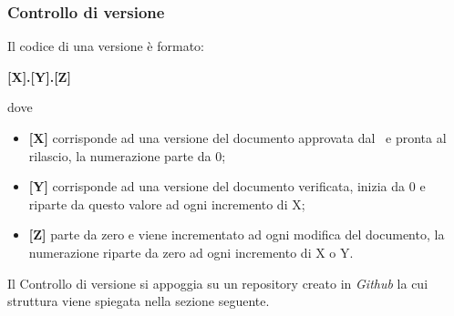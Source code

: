 \subsubsection{Controllo di versione}\label{Versionamento}
Il codice di una versione è formato: 
\begin{center}
	\textbf{[X].[Y].[Z]}
\end{center}
dove 
\begin{itemize}
	\item \textbf{[X]} corrisponde ad una versione del documento approvata dal \Responsabile\ e pronta al rilascio, la numerazione parte da 0;
	\item \textbf{[Y]} corrisponde ad una versione del documento verificata, inizia da 0 e riparte da questo valore ad ogni incremento di X;
	\item \textbf{[Z]} parte da zero e viene incrementato ad ogni modifica del documento, la numerazione riparte da zero ad ogni incremento di X o Y.
\end{itemize}
Il Controllo di versione si appoggia su un repository creato in \textit{Github} la cui struttura viene spiegata nella sezione seguente.

